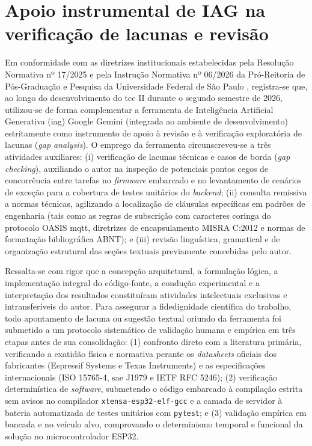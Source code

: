 \documentclass[
	12pt,				%
	openright,			%
	twoside,			%
	a4paper,			%
	english,			%
	brazil				%
	]{abntex2}
\begin{document}
\section{Apoio instrumental de IAG na verificação de lacunas e revisão}

Em conformidade com as diretrizes institucionais estabelecidas pela Resolução Normativa
nº 17/2025 e pela Instrução Normativa nº 06/2026 da Pró-Reitoria de Pós-Graduação e
Pesquisa da Universidade Federal de São Paulo \cite{unifesp_iag2026}, registra-se que,
ao longo do desenvolvimento do \acrshort{tcc} II durante o segundo semestre de 2026,
utilizou-se de forma complementar a ferramenta de Inteligência Artificial Generativa
(\acrshort{iag}) Google Gemini (integrada ao ambiente de desenvolvimento) estritamente
como instrumento de apoio à revisão e à verificação exploratória de lacunas
(\textit{gap analysis}). O emprego da ferramenta circunscreveu-se a três atividades
auxiliares: (i) verificação de lacunas técnicas e casos de borda
(\textit{gap checking}), auxiliando o autor na inspeção de potenciais pontos cegos de
concorrência entre tarefas no \textit{firmware} embarcado e no levantamento de cenários
de exceção para a cobertura de testes unitários do \textit{backend}; (ii) consulta
remissiva a normas técnicas, agilizando a localização de cláusulas específicas em
padrões de engenharia (tais como as regras de subscrição com caracteres coringa do
protocolo OASIS \acrshort{mqtt}, diretrizes de encapsulamento MISRA C:2012 e normas de
formatação bibliográfica ABNT); e (iii) revisão linguística, gramatical e de organização
estrutural das seções textuais previamente concebidas pelo autor.

Ressalta-se com rigor que a concepção arquitetural, a formulação lógica, a implementação
integral do código-fonte, a condução experimental e a interpretação dos resultados
constituíram atividades intelectuais exclusivas e intransferíveis do autor. Para
assegurar a fidedignidade científica do trabalho, todo apontamento de lacuna ou sugestão
textual oriundo da ferramenta foi submetido a um protocolo sistemático de validação
humana e empírica em três etapas antes de sua consolidação: (1) confronto direto com a
literatura primária, verificando a exatidão física e normativa perante os
\textit{datasheets} oficiais dos fabricantes (Espressif Systems e Texas Instruments) e
as especificações internacionais (ISO 15765-4, \acrshort{sae} J1979 e IETF RFC 5246);
(2) verificação determinística de \textit{software}, submetendo o código embarcado à
compilação estrita sem avisos no compilador \texttt{xtensa-esp32-elf-gcc} e a camada de
servidor à bateria automatizada de testes unitários com \texttt{pytest}; e (3) validação
empírica em bancada e no veículo alvo, comprovando o determinismo temporal e funcional
da solução no microcontrolador ESP32.
\end{document}
